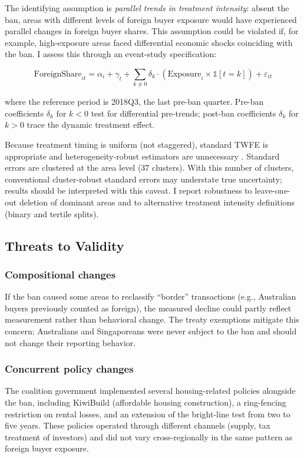 \documentclass[12pt]{article}
\begin{document}
The identifying assumption is \emph{parallel trends in treatment intensity}: absent the ban, areas with different levels of foreign buyer exposure would have experienced parallel changes in foreign buyer shares. This assumption could be violated if, for example, high-exposure areas faced differential economic shocks coinciding with the ban. I assess this through an event-study specification:

\begin{equation}
\text{ForeignShare}_{it} = \alpha_i + \gamma_t + \sum_{k \neq 0} \delta_k \cdot (\text{Exposure}_i \times \mathbb{1}[t = k]) + \varepsilon_{it}
\label{eq:event_study}
\end{equation}

where the reference period is 2018Q3, the last pre-ban quarter. Pre-ban coefficients $\delta_k$ for $k < 0$ test for differential pre-trends; post-ban coefficients $\delta_k$ for $k > 0$ trace the dynamic treatment effect.

Because treatment timing is uniform (not staggered), standard TWFE is appropriate and heterogeneity-robust estimators are unnecessary \citep{callaway2021difference}. Standard errors are clustered at the area level (37 clusters). With this number of clusters, conventional cluster-robust standard errors may understate true uncertainty; results should be interpreted with this caveat. I report robustness to leave-one-out deletion of dominant areas and to alternative treatment intensity definitions (binary and tertile splits).

\subsection{Threats to Validity}

\subsubsection*{Compositional changes} If the ban caused some areas to reclassify ``border'' transactions (e.g., Australian buyers previously counted as foreign), the measured decline could partly reflect measurement rather than behavioral change. The treaty exemptions mitigate this concern: Australians and Singaporeans were never subject to the ban and should not change their reporting behavior.

\subsubsection*{Concurrent policy changes} The coalition government implemented several housing-related policies alongside the ban, including KiwiBuild (affordable housing construction), a ring-fencing restriction on rental losses, and an extension of the bright-line test from two to five years. These policies operated through different channels (supply, tax treatment of investors) and did not vary cross-regionally in the same pattern as foreign buyer exposure.
\end{document}

